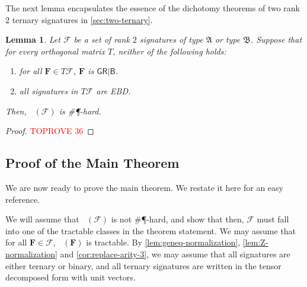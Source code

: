 \documentclass[11pt]{article}
\newtheorem{lemma}[theorem]{Lemma}
\DeclareMathOperator{\holts}{Holant^*_3}
\newcommand{\db}{\mathsf{B}}
\newcommand{\dg}{\mathsf{G}}
\newcommand{\dr}{\mathsf{R}}
\newcommand{\sph}{\#\P-hard\xspace}
\newcommand{\strspt}{\textsf{EBD}\xspace}
\newcommand{\bdgr}{\dg \dr | \db}
\newcommand{\ternarytractgeneq}{$\mathfrak{A}$\xspace}
\newcommand{\ternarytractz}{$\mathfrak{B}$\xspace}
\begin{document}
The next lemma encapsulates the essence of the dichotomy theorems of two rank $2$ ternary signatures in \cref{sec:two-ternary}.
\begin{lemma}\label{lem:set-of-ternary-signatures-must-bg-r-or-separate}
  Let $\mathcal{F}$ be a set of rank $2$ signatures of type \ternarytractgeneq or type \ternarytractz.
  Suppose that for every orthogonal matrix $T$, neither of the following holds:
  \begin{enumerate}
    \item for all $\mathbf{F} \in T \mathcal{F}$, $\mathbf{F}$ is $\bdgr$.
    \item all signatures in $T \mathcal{F}$ are \strspt.
  \end{enumerate}
  Then, $\holts(\mathcal{F})$ is \sph.
\end{lemma}
\begin{proof}\textcolor{red}{TOPROVE 36}\end{proof}

\subsection{Proof of the Main Theorem}
We are now ready to prove the main theorem.
We restate it here for an easy reference.
\maintheorem*

We will assume that $\holts(\mathcal{F})$ is not \sph, and show that then, $\mathcal{F}$ must fall into one of the tractable classes in the theorem statement.
We may assume that for all $\mathbf{F} \in \mathcal{F}$, $\holts(\mathbf{F})$ is tractable.
By \cref{lem:geneq-normalization}, \cref{lem:Z-normalization} and \cref{cor:replace-arity-3}, we may assume that all signatures are either ternary or binary, 
and all ternary signatures are written in the tensor decomposed form with unit vectors.
\end{document}
